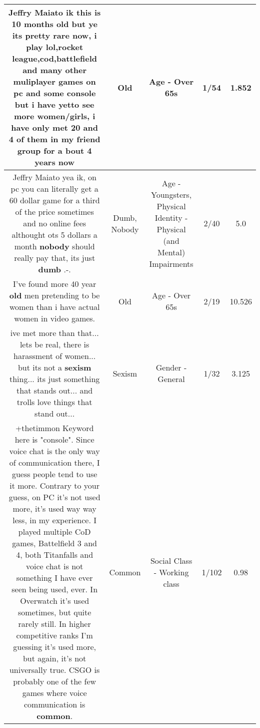 \documentclass[11pt]{article}
\newlength\mylength
\begin{document}
\begin{center}
\begin{longtable}{|C{.65\mylength}|C{.30\mylength}|C{.12\mylength}|C{.12\mylength}|C{.12\mylength}|}
  \small Jeffry Maiato ik this is 10 months \textbf{old} but ye its pretty rare now, i play lol,rocket league,cod,battlefield and many other muliplayer games on pc and some console but i have yetto see more women/girls, i have only met 20 and 4 of them in my friend group for a bout 4 years now\normalsize   & Old & Age - Over 65s & 1/54 & 1.852 \\  \hline
  \small Jeffry Maiato yea ik, on pc you can literally get a 60 dollar game for a third of the price sometimes and no online fees althought ots 5 dollars a month \textbf{nobody} should really pay that, its just \textbf{dumb} .-.\normalsize   & Dumb, Nobody & Age - Youngsters, Physical Identity - Physical (and Mental) Impairments & 2/40 & 5.0 \\  \hline
  \small I've found more 40 year \textbf{old} men pretending to be women than i have actual women in video games.\normalsize   & Old & Age - Over 65s & 2/19 & 10.526 \\  \hline
  \small ive met more than that... lets be real, there is harassment of women... but its not a \textbf{sexism} thing... its just something that stands out... and trolls love things that stand out...\normalsize   & Sexism & Gender - General & 1/32 & 3.125 \\  \hline
  \small +thetimmon Keyword here is "console". Since voice chat is the only way of communication there, I guess people tend to use it more. Contrary to your guess, on PC it's not used more, it's used way way less, in my experience. I played multiple CoD games, Battelfield 3 and 4, both Titanfalls and voice chat is not something I have ever seen being used, ever. In Overwatch it's used sometimes, but quite rarely still. In higher competitive ranks I'm guessing it's used more, but again, it's not universally true. CSGO is probably one of the few games where voice communication is \textbf{common}.\normalsize   & Common & Social Class - Working class & 1/102 & 0.98 \\  \hline

\end{longtable}
\end{center}
\end{document}
